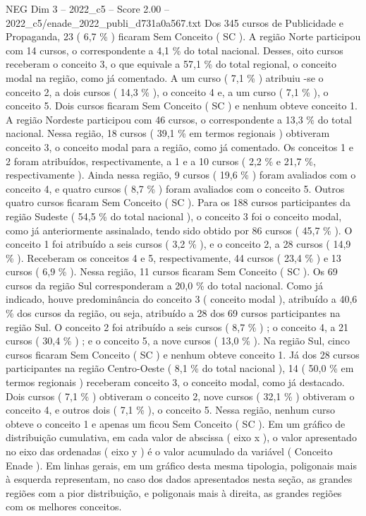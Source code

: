 \begin{textsample}{NEG Dim 3 – 2022\_c5 – Score 2.00 – 2022\_c5/enade\_2022\_publi\_d731a0a567.txt}
Dos 345 cursos de Publicidade e Propaganda, 23 ( 6,7 \% ) ficaram Sem Conceito ( SC ).
A região Norte participou com 14 cursos, o correspondente a 4,1 \% do total nacional.
Desses, oito cursos receberam o conceito 3, o que equivale a 57,1 \% do total regional, o conceito modal na região, como já comentado.
A um curso ( 7,1 \% ) atribuiu -se o conceito 2, a dois cursos ( 14,3 \% ), o conceito 4 e, a um curso ( 7,1 \% ), o conceito 5.
Dois cursos ficaram Sem Conceito ( SC ) e nenhum obteve conceito 1.
A região Nordeste participou com 46 cursos, o correspondente a 13,3 \% do total nacional.
Nessa região, 18 cursos ( 39,1 \% em termos regionais ) obtiveram conceito 3, o conceito modal para a região, como já comentado.
Os conceitos 1 e 2 foram atribuídos, respectivamente, a 1 e a 10 cursos ( 2,2 \% e 21,7 \%, respectivamente ).
Ainda nessa região, 9 cursos ( 19,6 \% ) foram avaliados com o conceito 4, e quatro cursos ( 8,7 \% ) foram avaliados com o conceito 5.
Outros quatro cursos ficaram Sem Conceito ( SC ).
Para os 188 cursos participantes da região Sudeste ( 54,5 \% do total nacional ), o conceito 3 foi o conceito modal, como já anteriormente assinalado, tendo sido obtido por 86 cursos ( 45,7 \% ).
O conceito 1 foi atribuído a seis cursos ( 3,2 \% ), e o conceito 2, a 28 cursos ( 14,9 \% ).
Receberam os conceitos 4 e 5, respectivamente, 44 cursos ( 23,4 \% ) e 13 cursos ( 6,9 \% ).
Nessa região, 11 cursos ficaram Sem Conceito ( SC ).
Os 69 cursos da região Sul corresponderam a 20,0 \% do total nacional.
Como já indicado, houve predominância do conceito 3 ( conceito modal ), atribuído a 40,6 \% dos cursos da região, ou seja, atribuído a 28 dos 69 cursos participantes na região Sul.
O conceito 2 foi atribuído a seis cursos ( 8,7 \% ) ; o conceito 4, a 21 cursos ( 30,4 \% ) ; e o conceito 5, a nove cursos ( 13,0 \% ).
Na região Sul, cinco cursos ficaram Sem Conceito ( SC ) e nenhum obteve conceito 1.
Já dos 28 cursos participantes na região Centro-Oeste ( 8,1 \% do total nacional ), 14 ( 50,0 \% em termos regionais ) receberam conceito 3, o conceito modal, como já destacado.
Dois cursos ( 7,1 \% ) obtiveram o conceito 2, nove cursos ( 32,1 \% ) obtiveram o conceito 4, e outros dois ( 7,1 \% ), o conceito 5.
Nessa região, nenhum curso obteve o conceito 1 e apenas um ficou Sem Conceito ( SC ).
Em um gráfico de distribuição cumulativa, em cada valor de abscissa ( eixo x ), o valor apresentado no eixo das ordenadas ( eixo y ) é o valor acumulado da variável ( Conceito Enade ).
Em linhas gerais, em um gráfico desta mesma tipologia, poligonais mais à esquerda representam, no caso dos dados apresentados nesta seção, as grandes regiões com a pior distribuição, e poligonais mais à direita, as grandes regiões com os melhores conceitos.

\end{textsample}
